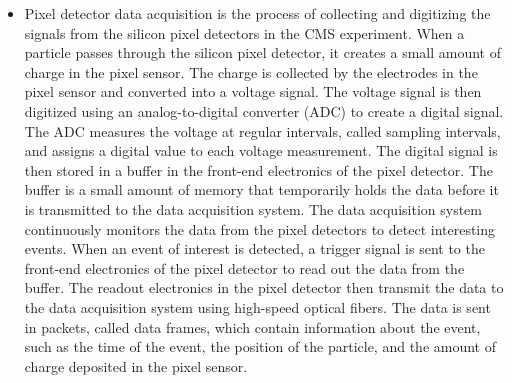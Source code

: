 \begin{itemize}

\item Pixel detector data acquisition is the process of collecting and digitizing the signals from the silicon pixel detectors in the CMS experiment. When a particle passes through the silicon pixel detector, it creates a small amount of charge in the pixel sensor. The charge is collected by the electrodes in the pixel sensor and converted into a voltage signal. The voltage signal is then digitized using an analog-to-digital converter (ADC) to create a digital signal. The ADC measures the voltage at regular intervals, called sampling intervals, and assigns a digital value to each voltage measurement. The digital signal is then stored in a buffer in the front-end electronics of the pixel detector. The buffer is a small amount of memory that temporarily holds the data before it is transmitted to the data acquisition system. The data acquisition system continuously monitors the data from the pixel detectors to detect interesting events. When an event of interest is detected, a trigger signal is sent to the front-end electronics of the pixel detector to read out the data from the buffer. The readout electronics in the pixel detector then transmit the data to the data acquisition system using high-speed optical fibers. The data is sent in packets, called data frames, which contain information about the event, such as the time of the event, the position of the particle, and the amount of charge deposited in the pixel sensor. %


\end{itemize}
